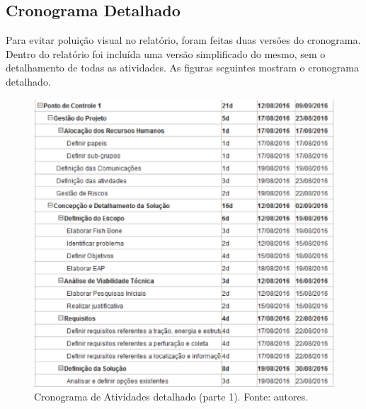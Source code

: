 \begin{apendicesenv}
\partapendices

\chapter{Cronograma Detalhado}
\label{schedule_ap}

Para evitar poluição visual no relatório, foram feitas duas versões do cronograma.
Dentro do relatório foi incluída uma versão simplificado do mesmo, sem o detalhamento de todas as atividades.
As figuras seguintes mostram o cronograma detalhado.

\begin{figure}[!htbp]
  \centering
  \includegraphics[width=\textwidth]{figuras/cronograma_det_1.eps}
  \caption{Cronograma de Atividades detalhado (parte 1). Fonte: autores.}
  \label{fig:cron_d1}
\end{figure}

\vfill
\pagebreak


\end{apendicesenv}
